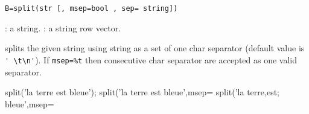 
\begin{mandesc}
\end{mandesc}
\begin{calling_sequence}
\begin{verbatim}
B=split(str [, msep=bool , sep= string]) 
\end{verbatim}
\end{calling_sequence}

\begin{parameters}
  \begin{varlist}
     : a string.
     : a string row vector.
  \end{varlist}
\end{parameters}

\begin{mandescription}
splits the given string using string as a set of one char separator 
(default value is \verb+' \t\n'+). If \verb+msep=%t+ then consecutive char
separator are accepted as one valid separator. 
\end{mandescription}

\begin{examples}
  \begin{program}
    split('la terre est bleue');
    split('la terre est   bleue',msep=%
    split('la terre,est; bleue',msep=%
  \end{program}
\end{examples}


